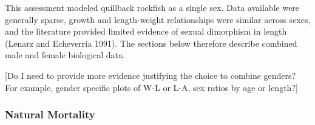 \documentclass[11pt,
  english,
  a4paper,
]{article}
\begin{document}
\leavevmode\tagmcend\tagstructend


This assessment modeled quillback rockfish as a single sex. Data available were generally sparse, growth and length-weight relationships were similar across sexes, and the literature provided limited evidence of sexual dimorphism in length {(Lenarz and Echeverria 1991)\leavevmode\tagmcend\tagstructend}. The sections below therefore describe combined male and female biological data.

\leavevmode\tagmcend\tagstructend\par


{[}Do I need to provide more evidence justifying the choice to combine genders? For example, gender specific plots of W-L or L-A, sex ratios by age or length?{]}

\leavevmode\tagmcend\tagstructend\par


\hypertarget{natural-mortality}{%
\subsubsection{Natural Mortality}\label{natural-mortality}}

\leavevmode\tagmcend\tagstructend

\end{document}
